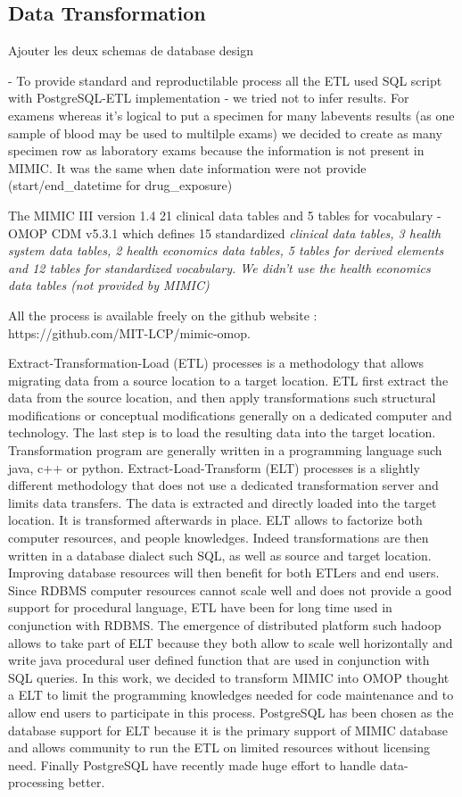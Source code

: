 \subsection{Data Transformation}

Ajouter les deux schemas de database design

- To provide standard and reproductilable process all the ETL used SQL script
  with PostgreSQL-ETL implementation
- we tried  not to infer results. For examens whereas it's logical to put a
  specimen for many labevents results (as one sample of blood may be used to
  multilple exams) we decided to create as many specimen row as laboratory
  exams because the information is not present in MIMIC. It was the same when
  date information were not provide (start/end\_datetime for drug\_exposure)

The MIMIC III version 1.4 21 clinical data tables and 5 tables for vocabulary
- OMOP CDM v5.3.1 which defines 15 standardized \it{clinical} data tables, 3
\it{health} system data tables, 2 \it{health economics} data tables, 5 tables
for \it{derived} elements and 12 tables for standardized \it{vocabulary}. 
We didn’t use the health economics data tables (not provided by MIMIC)

All the process is available freely on the github website :
https://github.com/MIT-LCP/mimic-omop.

Extract-Transformation-Load (ETL) processes is a methodology that allows
migrating data from a source location to a target location. ETL first extract
the data from the source location, and then apply transformations such
structural modifications or conceptual modifications generally on a dedicated
computer and technology. The last step is to load the resulting data into the
target location. Transformation program are generally written in a programming
language such java, c++ or python.
Extract-Load-Transform (ELT) processes is a slightly different methodology that
does not use a dedicated transformation server and limits data transfers. The
data is extracted and directly loaded into the target location. It is
transformed afterwards in place. ELT allows to factorize both computer
resources, and people knowledges. Indeed transformations are then written in a
database dialect such SQL, as well as source and target location. Improving
database resources will then benefit for both ETLers and end users. Since RDBMS
computer resources cannot scale well and does not provide a good support for
procedural language, ETL have been for long time used in conjunction with
RDBMS. The emergence of distributed platform such hadoop allows to take part
of ELT because they both allow to scale well horizontally and write java
procedural user defined function that are used in conjunction with SQL queries.
In this work, we decided to transform MIMIC into OMOP thought a ELT to limit
the programming knowledges needed for code maintenance and to allow end users
to participate in this process. PostgreSQL has been chosen as the database
support for ELT because it is the primary support of MIMIC database and allows
community to run the ETL on limited resources without licensing need. Finally
PostgreSQL have recently made huge effort to handle data-processing better.

